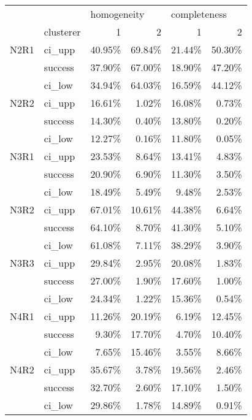 \begin{tabular}{llrrrr}
\toprule
     & {} & \multicolumn{2}{l}{homogeneity} & \multicolumn{2}{l}{completeness} \\
     & clusterer &           1 &      2 &            1 &      2 \\
\midrule
N2R1 & ci\_upp &      40.95\% & 69.84\% &       21.44\% & 50.30\% \\
     & success &      37.90\% & 67.00\% &       18.90\% & 47.20\% \\
     & ci\_low &      34.94\% & 64.03\% &       16.59\% & 44.12\% \\
N2R2 & ci\_upp &      16.61\% &  1.02\% &       16.08\% &  0.73\% \\
     & success &      14.30\% &  0.40\% &       13.80\% &  0.20\% \\
     & ci\_low &      12.27\% &  0.16\% &       11.80\% &  0.05\% \\
N3R1 & ci\_upp &      23.53\% &  8.64\% &       13.41\% &  4.83\% \\
     & success &      20.90\% &  6.90\% &       11.30\% &  3.50\% \\
     & ci\_low &      18.49\% &  5.49\% &        9.48\% &  2.53\% \\
N3R2 & ci\_upp &      67.01\% & 10.61\% &       44.38\% &  6.64\% \\
     & success &      64.10\% &  8.70\% &       41.30\% &  5.10\% \\
     & ci\_low &      61.08\% &  7.11\% &       38.29\% &  3.90\% \\
N3R3 & ci\_upp &      29.84\% &  2.95\% &       20.08\% &  1.83\% \\
     & success &      27.00\% &  1.90\% &       17.60\% &  1.00\% \\
     & ci\_low &      24.34\% &  1.22\% &       15.36\% &  0.54\% \\
N4R1 & ci\_upp &      11.26\% & 20.19\% &        6.19\% & 12.45\% \\
     & success &       9.30\% & 17.70\% &        4.70\% & 10.40\% \\
     & ci\_low &       7.65\% & 15.46\% &        3.55\% &  8.66\% \\
N4R2 & ci\_upp &      35.67\% &  3.78\% &       19.56\% &  2.46\% \\
     & success &      32.70\% &  2.60\% &       17.10\% &  1.50\% \\
     & ci\_low &      29.86\% &  1.78\% &       14.89\% &  0.91\% \\

\end{tabular}
